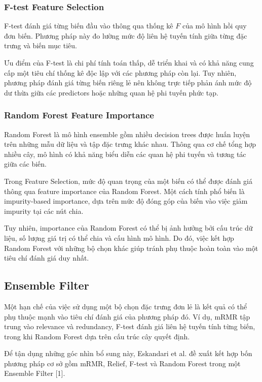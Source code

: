 \subsubsection{F-test Feature Selection}

F-test đánh giá từng biến đầu vào thông qua thống kê $F$ của mô hình
hồi quy đơn biến. Phương pháp này đo lường mức độ liên hệ tuyến tính
giữa từng đặc trưng và biến mục tiêu.

Ưu điểm của F-test là chi phí tính toán thấp, dễ triển khai và
có khả năng cung cấp một tiêu chí thống kê độc lập với các phương
pháp còn lại. Tuy nhiên, phương pháp đánh giá từng biến riêng lẻ
nên không trực tiếp phản ánh mức độ dư thừa giữa các predictors
hoặc những quan hệ phi tuyến phức tạp.

\subsubsection{Random Forest Feature Importance}

Random Forest là mô hình ensemble gồm nhiều decision trees được
huấn luyện trên những mẫu dữ liệu và tập đặc trưng khác nhau.
Thông qua cơ chế tổng hợp nhiều cây, mô hình có khả năng biểu diễn
các quan hệ phi tuyến và tương tác giữa các biến.

Trong Feature Selection, mức độ quan trọng của một biến có thể
được đánh giá thông qua feature importance của Random Forest.
Một cách tính phổ biến là impurity-based importance, dựa trên mức
độ đóng góp của biến vào việc giảm impurity tại các nút chia.

Tuy nhiên, importance của Random Forest có thể bị ảnh hưởng bởi
cấu trúc dữ liệu, số lượng giá trị có thể chia và cấu hình mô hình.
Do đó, việc kết hợp Random Forest với những bộ chọn khác giúp
tránh phụ thuộc hoàn toàn vào một tiêu chí đánh giá duy nhất.

\subsection{Ensemble Filter}
\label{subsec:ensemble-filter-original}

Một hạn chế của việc sử dụng một bộ chọn đặc trưng đơn lẻ là kết quả
có thể phụ thuộc mạnh vào tiêu chí đánh giá của phương pháp đó.
Ví dụ, mRMR tập trung vào relevance và redundancy, F-test đánh giá
liên hệ tuyến tính từng biến, trong khi Random Forest dựa trên cấu
trúc cây quyết định.

Để tận dụng những góc nhìn bổ sung này, Eskandari et al. đề xuất
kết hợp bốn phương pháp cơ sở gồm mRMR, Relief, F-test và Random
Forest trong một Ensemble Filter [1].

